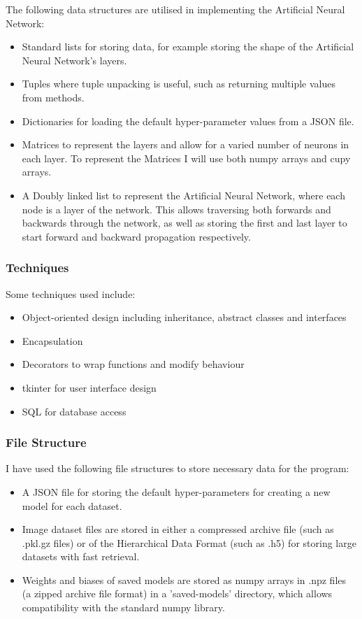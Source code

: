 \documentclass[./project-report/src/latex/project-report.tex]{subfiles}
\begin{document}
The following data structures are utilised in implementing the Artificial Neural Network:

\begin{itemize}
    \item Standard lists for storing data, for example storing the shape of the Artificial Neural Network's layers.
    \item Tuples where tuple unpacking is useful, such as returning multiple values from methods.
    \item Dictionaries for loading the default hyper-parameter values from a JSON file.
    \item Matrices to represent the layers and allow for a varied number of neurons in each layer. To represent the Matrices I will use both numpy arrays and cupy 
          arrays.
    \item A Doubly linked list to represent the Artificial Neural Network, where each node is a layer of the network. This allows traversing both forwards and 
          backwards through the network, as well as storing the first and last layer to start forward and backward propagation respectively.
\end{itemize}

\subsubsection{Techniques}

Some techniques used include:

\begin{itemize}
    \item Object-oriented design including inheritance, abstract classes and interfaces
    \item Encapsulation
    \item Decorators to wrap functions and modify behaviour
    \item tkinter for user interface design
    \item SQL for database access
\end{itemize}

\subsubsection{File Structure}

I have used the following file structures to store necessary data for the program:

\begin{itemize}
	\item A JSON file \cite{w3json} for storing the default hyper-parameters for creating a new model for each dataset.
	\item Image dataset files are stored in either a compressed archive file (such as .pkl.gz files) or of the Hierarchical Data Format (such as .h5) for storing large 
		  datasets with fast retrieval.
	\item Weights and biases of saved models are stored as numpy arrays in .npz files (a zipped archive file format) in a 'saved-models' directory, which allows compatibility 
		  with the standard numpy library.
\end{itemize}
\end{document}

